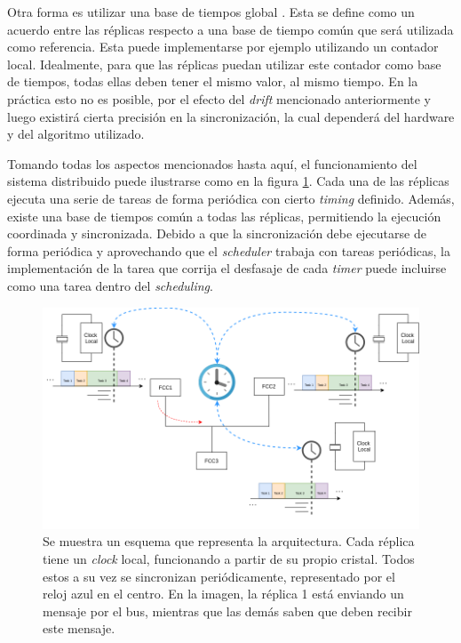 Otra forma es utilizar una base de tiempos global \cite[p.~51]{kopetz-2011}. Esta se define como un acuerdo entre las réplicas respecto a una base de tiempo común que será utilizada como referencia. Esta puede implementarse por ejemplo utilizando un contador local. Idealmente, para que las réplicas puedan utilizar este contador como base de tiempos, todas ellas deben tener el mismo valor, al mismo tiempo. En la práctica esto no es posible, por el efecto del \textit{drift} mencionado anteriormente y luego existirá cierta precisión en la sincronización, la cual dependerá del hardware y del algoritmo utilizado.

Tomando todas los aspectos mencionados hasta aquí, el funcionamiento del sistema distribuido puede ilustrarse como en la figura \ref{fig:diagrama_TTA}. Cada una de las réplicas ejecuta una serie de tareas de forma periódica con cierto \textit{timing} definido. Además, existe una base de tiempos común a todas las réplicas, permitiendo la ejecución coordinada y sincronizada. Debido a que la sincronización debe ejecutarse de forma periódica y aprovechando que el \textit{scheduler} trabaja con tareas periódicas, la implementación de la tarea que corrija el desfasaje de cada \textit{timer} puede incluirse como una tarea dentro del \textit{scheduling}.

\begin{figure}[H]
    \centering
    \includegraphics[width=\textwidth]{img/diagrama_TTA.png}
    \caption{Se muestra un esquema que representa la arquitectura. Cada réplica tiene un \textit{clock} local, funcionando a partir de su propio cristal. Todos estos a su vez se sincronizan periódicamente, representado por el reloj azul en el centro. En la imagen, la réplica 1 está enviando un mensaje por el bus, mientras que las demás saben que deben recibir este mensaje.}
    \label{fig:diagrama_TTA}
\end{figure}

